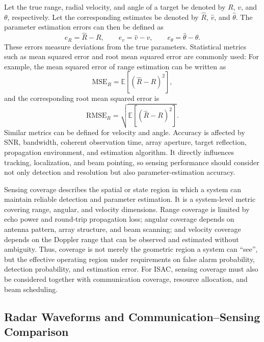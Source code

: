 Let the true range, radial velocity, and angle of a target be denoted by
\(R\), \(v\), and \(\theta\), respectively.
Let the corresponding estimates be denoted by \(\hat{R}\), \(\hat{v}\), and
\(\hat{\theta}\).
The parameter estimation errors can then be defined as
\begin{equation}
    e_R=\hat{R}-R,\qquad
    e_v=\hat{v}-v,\qquad
    e_\theta=\hat{\theta}-\theta.
    \label{eq:parameter_estimation_errors}
\end{equation}
These errors measure deviations from the true parameters.
Statistical metrics such as mean squared error and root mean squared error are
commonly used:
For example, the mean squared error of range estimation can be written as
\begin{equation}
    \mathrm{MSE}_R
    =
    \mathbb{E}\left[(\hat{R}-R)^2\right],
    \label{eq:range_mse}
\end{equation}
and the corresponding root mean squared error is
\begin{equation}
    \mathrm{RMSE}_R
    =
    \sqrt{\mathbb{E}\left[(\hat{R}-R)^2\right]}.
    \label{eq:range_rmse}
\end{equation}
Similar metrics can be defined for velocity and angle.
Accuracy is affected by SNR, bandwidth, coherent observation time, array
aperture, target reflection, propagation environment, and estimation algorithm.
It directly influences tracking, localization, and beam pointing, so sensing
performance should consider not only detection and resolution but also
parameter-estimation accuracy.

Sensing coverage describes the spatial or state region in which a system can
maintain reliable detection and parameter estimation.
It is a system-level metric covering range, angular, and velocity dimensions.
Range coverage is limited by echo power and round-trip propagation loss;
angular coverage depends on antenna pattern, array structure, and beam
scanning; and velocity coverage depends on the Doppler range that can be
observed and estimated without ambiguity.
Thus, coverage is not merely the geometric region a system can ``see'', but the
effective operating region under requirements on false alarm probability,
detection probability, and estimation error.
For ISAC, sensing coverage must also be considered together with communication
coverage, resource allocation, and beam scheduling.

\subsection{Radar Waveforms and Communication--Sensing Comparison}

